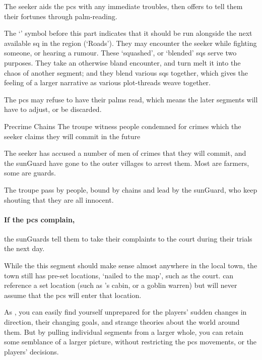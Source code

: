 \begin{multicols}{2}
The \gls{seeker} aids the \glspl{pc} with any immediate troubles, then offers to tell them their fortunes through palm-reading.

The `\squash' symbol before this part indicates that it should be run alongside the next available \gls{sq} in the region (`Roads').
They may encounter the \gls{seeker} while fighting someone, or hearing a rumour.
These `squashed', or `blended' \glspl{sq} serve two purposes.
They take an otherwise bland encounter, and turn melt it into the chaos of another \gls{segment}; and they blend various \glspl{sq} together, which gives the feeling of a larger narrative as various plot-threads weave together.

The \glspl{pc} may refuse to have their palms read, which means the later \glspl{segment} will have to adjust, or be discarded.

{Precrime Chains}%
{The troupe witness people condemned for crimes which the \gls{seeker} claims they will commit in the future}%

\begin{exampletext}
  The \gls{seeker} has accused a number of men of crimes that they will commit, and the \gls{sunGuard} have gone to the outer \glspl{village} to arrest them.
  Most are farmers, some are \glspl{guard}.
\end{exampletext}

The troupe pass by people, bound by chains and lead by the \gls{sunGuard}, who keep shouting that they are all innocent.

\paragraph{If the \glspl{pc} complain,}
the \glspl{sunGuard} tell them to take their complaints to the \gls{court} during their trials the next day.

While the this \gls{segment} should make sense almost anywhere in the local town, the town still has pre-set locations, `nailed to the map', such as the \gls{court}.
 can reference a set location (such as 's cabin, or a goblin warren) but will never assume that the \glspl{pc} will enter that location.

As , you can easily find yourself unprepared for the players' sudden changes in direction, their changing goals, and strange theories about the world around them.
But by pulling individual \glspl{segment} from a larger whole, you can retain some semblance of a larger picture, without restricting the \glspl{pc} movements, or the players' decisions.


\end{multicols}
